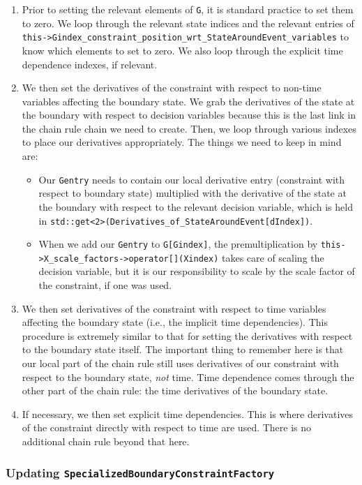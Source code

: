 \documentclass[11pt]{article}
\begin{document}
\begin{enumerate}
	\item Prior to setting the relevant elements of \texttt{G}, it is standard practice to set them to zero. We loop through the relevant state indices and the relevant entries of \texttt{this->Gindex\_constraint\_position\_wrt\_StateAroundEvent\_variables} to know which elements to set to zero. We also loop through the explicit time dependence indexes, if relevant.
	\item We then set the derivatives of the constraint with respect to non-time variables affecting the boundary state. We grab the derivatives of the state at the boundary with respect to decision variables because this is the last link in the chain rule chain we need to create. Then, we loop through various indexes to place our derivatives appropriately. The things we need to keep in mind are:
	\begin{itemize}
		\item Our \texttt{Gentry} needs to contain our local derivative entry (constraint with respect to boundary state) multiplied with the derivative of the state at the boundary with respect to the relevant decision variable, which is held in \texttt{std::get<2>(Derivatives\_of\_StateAroundEvent[dIndex])}.
		\item When we add our \texttt{Gentry} to \texttt{G[Gindex]}, the premultiplication by \texttt{this->X\_scale\_factors->operator[](Xindex)} takes care of scaling the decision variable, but it is our responsibility to scale by the scale factor of the constraint, if one was used.
	\end{itemize}
	\item We then set derivatives of the constraint with respect to time variables affecting the boundary state (i.e., the implicit time dependencies). This procedure is extremely similar to that for setting the derivatives with respect to the boundary state itself. The important thing to remember here is that our local part of the chain rule still uses derivatives of our constraint with respect to the boundary state, \emph{not} time. Time dependence comes through the other part of the chain rule: the time derivatives of the boundary state.
	\item If necessary, we then set explicit time dependencies. This is where derivatives of the constraint directly with respect to time are used. There is no additional chain rule beyond that here.
\end{enumerate}

\subsubsection{Updating \texttt{SpecializedBoundaryConstraintFactory}}
\end{document}
